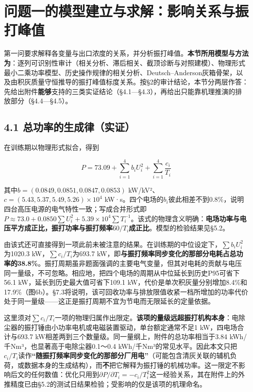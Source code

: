 \documentclass[UTF8,zihao=5,a4paper]{ctexart}
\begin{document}
\section{问题一的模型建立与求解：影响关系与振打峰值}

第一问要求解释各变量与出口浓度的关系，并分析振打峰值。\textbf{本节所用模型与方法为}：逐列可识别性审计（相关分析、滞后相关、截顶诊断与对照建模）、物理形式最小二乘功率模型、历史操作规律的相关分析、Deutsch–Anderson灰箱骨架，以及由积灰质量守恒推导的振打峰值标度关系。按§2的审计结论，本节分两层作答：先给出附件\textbf{能够}支持的三类实证结论（§4.1—§4.3），再给出只能靠机理推演的排放部分（§4.4—§4.5）。

\subsection*{4.1 总功率的生成律（实证）}

在训练期以物理形式拟合，得到

\begin{equation}
P=73.09+\sum_{i=1}^{4}b_iU_i^{2}+\sum_{i=1}^{4}\frac{c_i}{T_i}
\end{equation}

其中$b=(0.0849,0.0851,0.0847,0.0853)$ kW/kV²、$c=(5.43,5.37,5.49,5.26)\times10^{4}$ kW·s。四个电场的$b_i$彼此相差不到0.8\%，说明四台高压电源的电气特性一致；写成合并形式即$P\approx73.0+0.0850\sum U_i^2+5.39\times10^{4}\sum T_i^{-1}$。该式的物理含义明确：\textbf{电场功率与电压平方成正比，振打功率与振打频率$60/T_i$成正比}。模型的检验结果见§5.2。

由该式还可直接得到一项此前未被注意的结果。在训练期的中位设定下，$\sum b_iU_i^2$为1020.3 kW，$\sum c_i/T_i$为693.7 kW，即\textbf{与振打频率同步变化的那部分电耗占总功率的38.8\%}。振打周期虽非题面强调的主要电气变量，但其对电耗的贡献与电压同一量级，不可忽略。相应地，把四个电场的周期从中位延长到历史P95可省下56.1 kW，延长到历史最大值可省下109.1 kW，代价是单次积灰量分别增加8.4\%和17.9\%（图6b）。§7.3将说明，该可回收功率与排放限值收紧一档所增加的功率代价处于同一量级——这正是振打周期不宜为节电而无限延长的定量依据。

这里须对$\sum c_i/T_i$一项的物理归属作出限定。\textbf{该项的量级远超振打机构本身}：电除尘器的振打锤由小功率电机或电磁装置驱动，单台额定通常不足1 kW，四电场合计与693.7 kW相差两到三个数量级。同一量纲上，附件的总功率相当于3.84 kWh/千Nm³，也显著高于电除尘器0.1～0.4 kWh/千Nm³的常见水平。因此本文只把$c_i/T_i$读作\textbf{“随振打频率同步变化的那部分厂用电”}（可能包含清灰关联的辅机负荷，或数据本身的生成结构），而\textbf{不}把它解释为振打锤的机械功率。这一限定不影响后文的任何数值：优化只用到$\partial P/\partial T_i=-c_i/T_i^2$这一经验关系，其在附件上的外推精度已由§5.2的测试日结果检验；受影响的仅是该项的机理命名。
\end{document}
